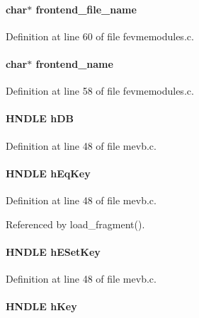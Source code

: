 \paragraph[{frontend\_\-file\_\-name}]{\setlength{\rightskip}{0pt plus 5cm}char$\ast$ {\bf frontend\_\-file\_\-name}}\hfill\label{mevb_8c_ac7fc683b5a25d9607abc270a54db6d97}


Definition at line 60 of file fevmemodules.c.
\paragraph[{frontend\_\-name}]{\setlength{\rightskip}{0pt plus 5cm}char$\ast$ {\bf frontend\_\-name}}\hfill\label{mevb_8c_ac1f0c6df66e35778b61c611107501ec4}


Definition at line 58 of file fevmemodules.c.
\paragraph[{hDB}]{\setlength{\rightskip}{0pt plus 5cm}HNDLE {\bf hDB}}\hfill\label{mevb_8c_ab1f60c53f74e806a3b9f687af38d7421}


Definition at line 48 of file mevb.c.
\paragraph[{hEqKey}]{\setlength{\rightskip}{0pt plus 5cm}HNDLE {\bf hEqKey}}\hfill\label{mevb_8c_a5a2c83bfdd4f24036f93557d58ddaaca}


Definition at line 48 of file mevb.c.

Referenced by load\_\-fragment().
\paragraph[{hESetKey}]{\setlength{\rightskip}{0pt plus 5cm}HNDLE {\bf hESetKey}}\hfill\label{mevb_8c_a6a5e7c07c31df2cab3fcb8a42b8ba5a5}


Definition at line 48 of file mevb.c.
\paragraph[{hKey}]{\setlength{\rightskip}{0pt plus 5cm}HNDLE {\bf hKey}}\hfill\label{mevb_8c_a8cd567d23219ba7fc83280cf20caf1c2}


